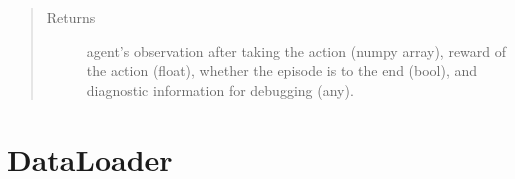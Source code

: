 \documentclass[letterpaper,10pt,english]{sphinxmanual}
\begin{document}
\begin{fulllineitems}
\begin{fulllineitems}
\begin{quote}
\begin{description}
\item[{Returns}] \leavevmode
\sphinxAtStartPar
agent’s observation after taking the action (numpy array),
reward of the action (float),
whether the episode is to the end (bool), and
diagnostic information for debugging (any).

\end{description}\end{quote}

\end{fulllineitems}


\end{fulllineitems}



\section{DataLoader}
\label{\detokenize{DataLoader:module-crypto_env.dataloader}}\label{\detokenize{DataLoader:dataloader}}\label{\detokenize{DataLoader::doc}}
\end{document}
